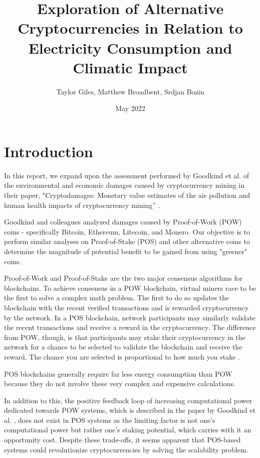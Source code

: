 \documentclass{article}
\title{Exploration of Alternative Cryptocurrencies in Relation to Electricity Consumption and Climatic Impact}
\author{Taylor Giles, Matthew Broadbent, Srdjan Bozin}
\date{May 2022}
\begin{document}
\maketitle

\section{Introduction}

In this report, we expand upon the assessment performed by Goodkind et al. of the environmental and economic damages caused by cryptocurrency mining in their paper, "Cryptodamages: Monetary value estimates of the air pollution and human health impacts of cryptocurrency mining'' \cite{goodkind}.

Goodkind and colleagues analyzed damages caused by Proof-of-Work (POW) coins - specifically Bitcoin, Ethereum, Litecoin, and Monero. Our objective is to perform similar analyses on Proof-of-Stake (POS) and other alternative coins to determine the magnitude of potential benefit to be gained from using "greener" coins. 

Proof-of-Work and Proof-of-Stake are the two major consensus algorithms for blockchains. To achieve consensus in a POW blockchain, virtual miners race to be the first to solve a complex math problem. The first to do so updates the blockchain with the recent verified transactions and is rewarded cryptocurrency by the network. In a POS blockchain, network participants may similarly validate the recent transactions and receive a reward in the cryptocurrency. The difference from POW, though, is that participants may stake their cryptocurrency in the network for a chance to be selected to validate the blockchain and receive the reward. The chance you are selected is proportional to how much you stake \cite{posscale}. 

POS blockchains generally require far less energy consumption than POW because they do not involve these very complex and expensive calculations.

In addition to this, the positive feedback loop of increasing computational power dedicated towards POW systems, which is described in the paper by Goodkind et al. \cite{goodkind}, does not exist in POS systems as the limiting factor is not one's computational power but rather one's staking potential, which carries with it an opportunity cost. Despite these trade-offs, it seems apparent that POS-based systems could revolutionize cryptocurrencies by solving the scalability problem.
\end{document}
